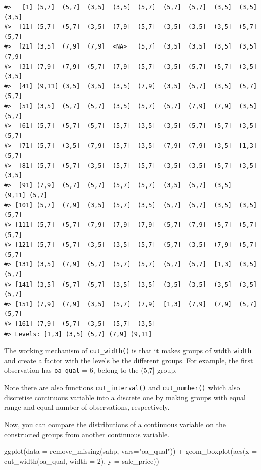 \documentclass[
]{book}
\newenvironment{Shaded}{\begin{snugshade}}{\end{snugshade}}
\newcommand{\AttributeTok}[1]{\textcolor[rgb]{0.77,0.63,0.00}{#1}}
\newcommand{\DecValTok}[1]{\textcolor[rgb]{0.00,0.00,0.81}{#1}}
\newcommand{\FunctionTok}[1]{\textcolor[rgb]{0.00,0.00,0.00}{#1}}
\newcommand{\NormalTok}[1]{#1}
\newcommand{\SpecialCharTok}[1]{\textcolor[rgb]{0.00,0.00,0.00}{#1}}
\newcommand{\StringTok}[1]{\textcolor[rgb]{0.31,0.60,0.02}{#1}}
\begin{document}
\begin{verbatim}
#>   [1] (5,7]  (5,7]  (3,5]  (3,5]  (5,7]  (5,7]  (5,7]  (3,5]  (3,5]  (3,5] 
#>  [11] (5,7]  (5,7]  (3,5]  (7,9]  (5,7]  (3,5]  (3,5]  (3,5]  (5,7]  (5,7] 
#>  [21] (3,5]  (7,9]  (7,9]  <NA>   (5,7]  (3,5]  (3,5]  (3,5]  (3,5]  (7,9] 
#>  [31] (7,9]  (7,9]  (5,7]  (7,9]  (5,7]  (3,5]  (5,7]  (5,7]  (3,5]  (3,5] 
#>  [41] (9,11] (3,5]  (3,5]  (3,5]  (7,9]  (3,5]  (5,7]  (3,5]  (5,7]  (5,7] 
#>  [51] (3,5]  (5,7]  (5,7]  (3,5]  (5,7]  (5,7]  (7,9]  (7,9]  (3,5]  (5,7] 
#>  [61] (5,7]  (5,7]  (5,7]  (5,7]  (3,5]  (3,5]  (5,7]  (5,7]  (3,5]  (5,7] 
#>  [71] (5,7]  (3,5]  (7,9]  (5,7]  (3,5]  (7,9]  (7,9]  (3,5]  [1,3]  (5,7] 
#>  [81] (5,7]  (5,7]  (3,5]  (5,7]  (5,7]  (3,5]  (3,5]  (5,7]  (3,5]  (3,5] 
#>  [91] (7,9]  (5,7]  (5,7]  (5,7]  (5,7]  (3,5]  (5,7]  (3,5]  (9,11] (5,7] 
#> [101] (5,7]  (7,9]  (3,5]  (5,7]  (3,5]  (5,7]  (5,7]  (3,5]  (3,5]  (5,7] 
#> [111] (5,7]  (5,7]  (7,9]  (7,9]  (7,9]  (5,7]  (7,9]  (5,7]  (5,7]  (5,7] 
#> [121] (5,7]  (5,7]  (3,5]  (3,5]  (5,7]  (5,7]  (3,5]  (7,9]  (5,7]  (5,7] 
#> [131] (3,5]  (7,9]  (5,7]  (5,7]  (5,7]  (5,7]  (5,7]  [1,3]  (3,5]  (5,7] 
#> [141] (3,5]  (5,7]  (5,7]  (3,5]  (3,5]  (3,5]  (3,5]  (3,5]  (3,5]  (5,7] 
#> [151] (7,9]  (7,9]  (3,5]  (5,7]  (7,9]  [1,3]  (7,9]  (7,9]  (5,7]  (5,7] 
#> [161] (7,9]  (5,7]  (3,5]  (5,7]  (3,5] 
#> Levels: [1,3] (3,5] (5,7] (7,9] (9,11]
\end{verbatim}

The working mechanism of \texttt{cut\_width()} is that it makes groups of width \texttt{width} and create a factor with the levels be the different groups. For example, the first observation has \texttt{oa\_qual} = 6, belong to the (5,7{]} group.

Note there are also functions \texttt{cut\_interval()} and \texttt{cut\_number()} which also discretise continuous variable into a discrete one by making groups with equal range and equal number of observations, respectively.

Now, you can compare the distributions of a continuous variable on the constructed groups from another continuous variable.

\begin{Shaded}
\begin{Highlighting}[]
\FunctionTok{ggplot}\NormalTok{(}\AttributeTok{data =} \FunctionTok{remove\_missing}\NormalTok{(sahp, }\AttributeTok{vars=}\StringTok{"oa\_qual"}\NormalTok{)) }\SpecialCharTok{+} \FunctionTok{geom\_boxplot}\NormalTok{(}\FunctionTok{aes}\NormalTok{(}\AttributeTok{x =} \FunctionTok{cut\_width}\NormalTok{(oa\_qual, }\AttributeTok{width =} \DecValTok{2}\NormalTok{), }\AttributeTok{y =}\NormalTok{ sale\_price))}
\end{Highlighting}
\end{Shaded}
\end{document}
